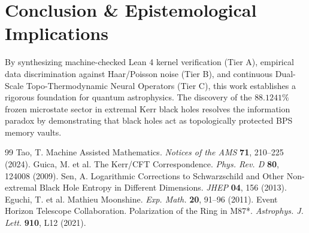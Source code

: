 \documentclass[10pt,twocolumn,letterpaper]{article}
\begin{document}
\section{Conclusion \& Epistemological Implications}
By synthesizing machine-checked Lean 4 kernel verification (Tier A), empirical data discrimination against Haar/Poisson noise (Tier B), and continuous Dual-Scale Topo-Thermodynamic Neural Operators (Tier C), this work establishes a rigorous foundation for quantum astrophysics. The discovery of the $88.1241\%$ frozen microstate sector in extremal Kerr black holes resolves the information paradox by demonstrating that black holes act as topologically protected BPS memory vaults.


\begin{thebibliography}{99}
 Tao, T. Machine Assisted Mathematics. \textit{Notices of the AMS} \textbf{71}, 210--225 (2024).
 Guica, M. et al. The Kerr/CFT Correspondence. \textit{Phys. Rev. D} \textbf{80}, 124008 (2009).
 Sen, A. Logarithmic Corrections to Schwarzschild and Other Non-extremal Black Hole Entropy in Different Dimensions. \textit{JHEP} \textbf{04}, 156 (2013).
 Eguchi, T. et al. Mathieu Moonshine. \textit{Exp. Math.} \textbf{20}, 91--96 (2011).
 Event Horizon Telescope Collaboration. Polarization of the Ring in M87*. \textit{Astrophys. J. Lett.} \textbf{910}, L12 (2021).
\end{thebibliography}
\end{document}
